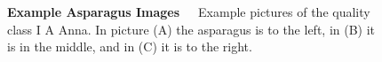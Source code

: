 \begin{figure}
    \centering
    \qquad
    \qquad
    \caption[Example Asparagus Images]{\textbf{Example Asparagus Images}~~~Example pictures of the quality class I A Anna. In picture (A) the asparagus is to the left, in (B) it is in the middle, and in (C) it is to the right.}
    \label{fig:ExampleImagesAnna}
\end{figure}

